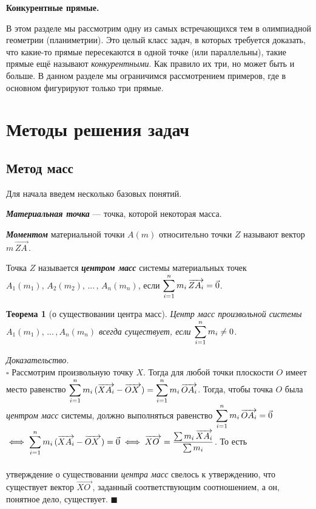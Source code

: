 \documentclass[14pt]{extarticle}
\let\Overrightarrow\overrightarrow
\let\vecarrow\overrightarrow
\newtheorem*{theorem}{\normalfont\fontsize{15}{15}\textup{Теорема}}
\renewenvironment{proof}
    {\noindent \textit{Доказательство.}\\
	\indent $\square$}
	{ $\blacksquare$\\ }
\begin{document}
\begin{center}
	\textbf{\fontsize{23}{30}\selectfont Конкурентные прямые.}
\end{center}


В этом разделе мы рассмотрим одну из самых встречающихся тем 
в олимпиадной геометрии (планиметрии). Это целый класс
задач, в которых требуется доказать, что какие-то
прямые пересекаются в одной точке (или параллельны), такие прямые ещё называют
\textit{конкурентными}. Как правило их три, но может быть и больше.
В данном разделе мы ограничимся рассмотрением примеров,
где в основном фигурируют только три прямые.\\


\section*{Методы решения задач}

\subsection{Метод масс}
Для начала введем несколько базовых понятий.

\noindent \textit{\textbf{Материальная точка}} --- точка, которой 
 некоторая масса.

\noindent \textit{\textbf{Моментом}} материальной точки $A(m)$ относительно 
точки $Z$ называют вектор $m \, \Overrightarrow{ZA_{\,}}$.

\noindent Точка $Z$ называется \textit{\textbf{центром масс}} системы материальных 
точек\\
$A_1(m_1), \, A_2(m_2), \, ... \, , \, A_n(m_n)$, 
если $\mathlarger{\sum_{i=1}^{n} m_i \, \Overrightarrow{ZA_i} = \vec{0}}$.


\begin{theorem}[о существовании центра масс]
	Центр масс произвольной системы $A_1(m_1), \, ... \, ,A_n(m_n)$
	всегда существует, если $\mathlarger{\sum_{i=1}^{n} m_i \ne 0}$.
\end{theorem}

\begin{proof}
	Рассмотрим произвольную точку $X$. Тогда для любой  точки
	плоскости $O$ имеет место равенство $\mathlarger{\sum_{i=1}^{n}
	m_i \, (\vecarrow{XA_i} - \vecarrow{OX_{\, \,}}) = \sum_{i=1}^{n} 
	m_i \, \vecarrow{OA_i}}$. Тогда, чтобы точка $O$ была 
	\textit{центром масс} системы, должно выполняться равенство
	$\mathlarger{\sum_{i=1}^{n} 
	m_i \, \vecarrow{OA_i}} = \vec{0}$ $\iff \mathlarger{\sum_{i=1}^{n} m_i \,
	(\vecarrow{XA_i} - \vecarrow{OX_{\, \,}}) = \vec{0} \iff 
    \vecarrow{XO_{\;}} = \frac{\sum m_i \,
	\vecarrow{XA_i}}{\sum m_i}}$. То есть \\\onehalfspacing\\ утверждение
	о существовании \textit{центра масс} свелось к утверждению, что существует
	вектор $\vecarrow{XO_{\;}}$, заданный соответствующим соотношением, а он,
	понятное дело, существует. 
\end{proof}
\end{document}
